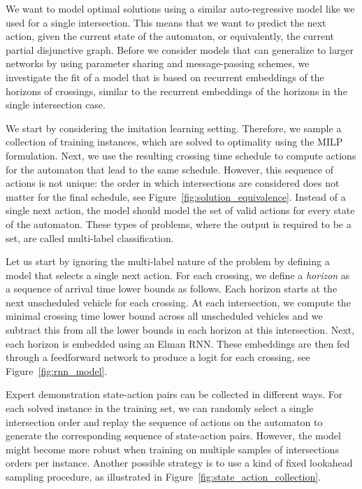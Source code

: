 \documentclass[a4paper]{article}
\theoremstyle{definition}
\theoremstyle{plain}
\begin{document}
We want to model optimal solutions using a similar auto-regressive model like we
used for a single intersection. This means that we want to predict the next
action, given the current state of the automaton, or equivalently, the current
partial disjunctive graph.
Before we consider models that can generalize to larger networks by using
parameter sharing and message-passing schemes, we investigate the fit of a model
that is based on recurrent embeddings of the horizons of crossings, similar to
the recurrent embeddings of the horizons in the single intersection case.

We start by considering the imitation learning setting. Therefore, we sample a
collection of training instances, which are solved to optimality using the MILP
formulation. Next, we use the resulting crossing time schedule to compute
actions for the automaton that lead to the same schedule.
However, this sequence of actions is not unique: the order in which
intersections are considered does not matter for the final schedule, see
Figure~\ref{fig:solution_equivalence}.
Instead of a single next action, the model should model the set of valid actions
for every state of the automaton. These types of problems, where the output is
required to be a set, are called multi-label classification.

Let us start by ignoring the multi-label nature of the problem by defining a
model that selects a single next action.
%
For each crossing, we define a \textit{horizon} as a sequence of arrival time
lower bounds as follows. Each horizon starts at the next unscheduled vehicle for
each crossing. At each intersection, we compute the minimal crossing time lower
bound across all unscheduled vehicles and we subtract this from all the lower
bounds in each horizon at this intersection.
%
Next, each horizon is embedded using an Elman RNN. These embeddings are then fed
through a feedforward network to produce a logit for each crossing, see
Figure~\ref{fig:rnn_model}.

Expert demonstration state-action pairs can be collected in different ways.
For each solved instance in the training set, we can randomly select a single
intersection order and replay the sequence of actions on the automaton to
generate the corresponding sequence of state-action pairs.
However, the model might become more robust when training on multiple samples of
intersections orders per instance.
Another possible strategy is to use a kind of fixed lookahead sampling
procedure, as illustrated in Figure~\ref{fig:state_action_collection}.
\end{document}
